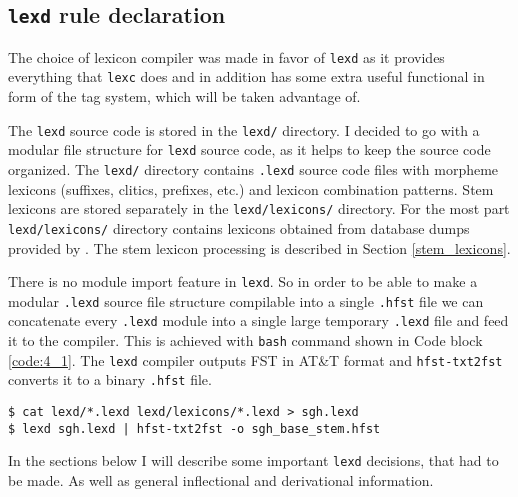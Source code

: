 \subsection{\texttt{lexd} rule declaration} \label{lexd_sec}
The choice of lexicon compiler was made in favor of \texttt{lexd} as it provides everything that \texttt{lexc} does and in addition has some extra useful functional in form of the tag system, which will be taken advantage of. 

The \texttt{lexd} source code is stored in the \texttt{lexd/} directory. I decided to go with a modular file structure for \texttt{lexd} source code, as it helps to keep the source code organized. The \texttt{lexd/} directory contains \texttt{.lexd} source code files with morpheme lexicons (suffixes, clitics, prefixes, etc.) and lexicon combination patterns. Stem lexicons are stored separately in the \texttt{lexd/lexicons/} directory. For the most part \texttt{lexd/lexicons/} directory contains lexicons obtained from database dumps provided by \textcite{makarov_digital_2022}. The stem lexicon processing is described in Section \ref{stem_lexicons}.

There is no module import feature in \texttt{lexd}. So in order to be able to make a modular \texttt{.lexd} source file structure compilable into a single \texttt{.hfst} file we can concatenate every \texttt{.lexd} module into a single large temporary \texttt{.lexd} file and feed it to the compiler. This is achieved with \texttt{bash} command shown in Code block \ref{code:4_1}. The \texttt{lexd} compiler outputs FST in AT\&T format and \texttt{hfst-txt2fst} converts it to a binary \texttt{.hfst} file.

\begin{code_frame}[float]
    \begin{footnotesize}\codespacing
    \begin{verbatim}
$ cat lexd/*.lexd lexd/lexicons/*.lexd > sgh.lexd
$ lexd sgh.lexd | hfst-txt2fst -o sgh_base_stem.hfst
    \end{verbatim}
    \end{footnotesize}
    \tcblower
    \label{code:4_1}
\end{code_frame}

In the sections below I will describe some important \texttt{lexd} decisions, that had to be made. As well as general inflectional and derivational information.

